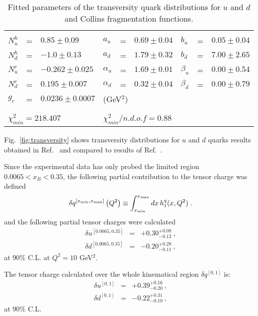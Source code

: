 \documentclass[twocolumn,showpacs,preprintnumbers,amsmath,amssymb,floatfix,prd]{revtex4}
\begin{document}
\begin{table}[htb]
\begin{tabular}{l c l l c l l c l}
\hline
 & & & & & & & &\\
$N_u^h$ &=& $0.85\pm 0.09$ & $a_u$ &=& $ 0.69 \pm 0.04$ & $b_u$ &=& $ 0.05 \pm 0.04$ \\
$N_d^h$ &=& $-1.0\pm 0.13$ & $a_d$ &=& $ 1.79 \pm 0.32$ & $b_d$ &=& $ 7.00 \pm 2.65$  \\
$N_u^c$ &=& $-0.262\pm 0.025$ & $\alpha_u$ &=& $ 1.69 \pm 0.01$ & $\beta_u$ &=& $ 0.00 \pm 0.54$ \\
$N_d^c$ &=& $0.195\pm 0.007$ & $\alpha_d$ &=& $ 0.32 \pm 0.04$ & $\beta_d$ &=& $ 0.00 \pm 0.79$ \\
$g_c$ &=& $0.0236\pm 0.0007$&\multicolumn{3}{l}{(GeV$^2$)}\\
& & & & & & & &\\
\hline
& & & & & & & &\\
\multicolumn{3}{l}{$\chi_{min}^2 =  218.407$} & \multicolumn{3}{l}{$\chi^2_{min}/{n.d.o.f}=0.88$}  \\
\end{tabular}
\caption{Fitted parameters of the transversity quark distributions for $u$ and $d$ and Collins fragmentation functions.}
\label{parameters}
\end{table}

Fig.~\ref{fig:transversity}  shows transversity distributions for $u$ and $d$ quarks results obtained in Ref.~\cite{Kang:2015msa} and compared to results of   Ref.~\cite{Anselmino:2013vqa}. 


Since the experimental data has only probed the limited region $0.0065 < x_B < 0.35$,
 the following partial contribution to the tensor charge was defined
\begin{eqnarray}
\delta q^{[x_{\rm min},x_{\rm max}]}\left(Q^2\right) \equiv   \int_{x_{\rm min}}^{x_{\rm max}}dx \, h_1^q(x,Q^2) \ .
\end{eqnarray}
and the following partial tensor charges were calculated ~\cite{Kang:2014zza}
\begin{eqnarray}
\delta u^{[0.0065,0.35]} &=&  +0.30_{-0.12}^{+0.08} \ ,\\
\delta d^{[0.0065,0.35]} &=&  -0.20_{-0.11}^{+0.28}   \ ,
\end{eqnarray}
at 90\% C.L. at  $Q^2=10$ GeV$^2$.

The tensor charge calculated over the whole kinematical region $\delta q^{[0,1]}$ is:
\begin{eqnarray}
\delta u^{[0,1]} &=&  +0.39_{-0.20}^{+0.16} \ ,\\
\delta d^{[0,1]} &=& -0.22_{-0.10}^{+0.31} \ ,
\end{eqnarray}
at 90\% C.L.
\end{document}
